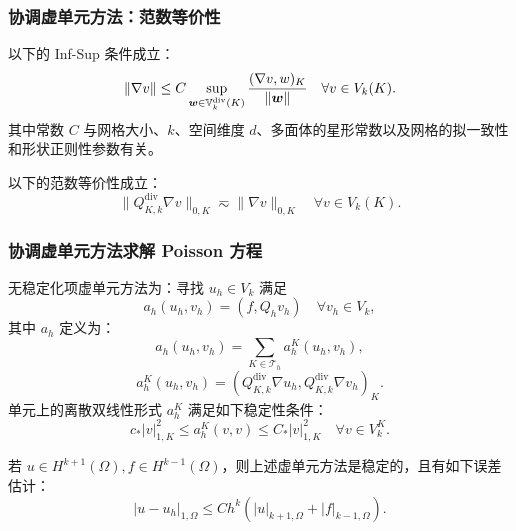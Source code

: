 \documentclass[notheorems,serif]{beamer}
\begin{document}
\begin{frame}
    \frametitle{协调虚单元方法：范数等价性}
    \begin{lemma}
        以下的 Inf-Sup 条件成立：
        $$
        \|\nabla v\| \leq C \sup_{\boldsymbol{w} \in
        \mathbb{V}^{\mathrm{div}}_{k}(K)}\frac{(\nabla v,
        w)_K}{\|\boldsymbol{w}\|} \quad \forall v \in V_k(K).
        $$
        其中常数 $C$ 与网格大小、$k$、空间维度 $d$、多面体的星形常数以及网格的拟一致性和形状正则性参数有关。
        
        以下的范数等价性成立：
        $$
        \|Q_{K, k}^{\mathrm{div}}\nabla v\|_{0, K} \eqsim \|\nabla v\|_{0, K} 
        \quad \forall v \in V_k(K).
        $$
    \end{lemma}
\end{frame}

\begin{frame}
    \frametitle{协调虚单元方法求解 Poisson 方程}
无稳定化项虚单元方法为：寻找 $u_h \in V_k$ 满足
$$
a_h(u_h, v_h) = (f, Q_h v_h) \quad \forall v_h \in V_k,
$$
其中 $a_h$ 定义为：
$$
a_h(u_h, v_h) = \sum_{K \in \mathcal{T}_h} a_h^K(u_h, v_h),
$$
$$
a_h^K(u_h, v_h) = (Q_{K, k}^{\mathrm{div}}\nabla u_h, Q_{K,
k}^{\mathrm{div}}\nabla v_h)_K.
$$
单元上的离散双线性形式 $a_h^K$ 满足如下稳定性条件：
$$
c_* |v|_{1, K}^2 \leq a_h^K(v, v) \leq C_* |v|_{1, K}^2 \quad \forall v \in
V_k^K.
$$
\begin{theorem}
若 $u \in H^{k+1}(\Omega), f \in H^{k-1}(\Omega)$，则上述虚单元方法是稳定的，且有如下误差估计：
$$
|u - u_h|_{1, \Omega} \leq C h^{k}
(|u|_{k+1, \Omega} + |f|_{k-1, \Omega}).
$$
\end{theorem}
\end{frame}
\end{document}
